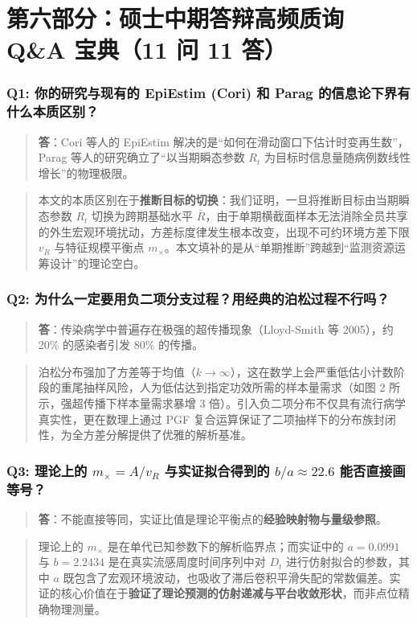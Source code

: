 \documentclass[11pt,a4paper]{ctexart}
\begin{document}
\section{第六部分：硕士中期答辩高频质询 Q\&A 宝典（11 问 11 答）}

\subsubsection{Q1: 你的研究与现有的 EpiEstim (Cori) 和 Parag 的信息论下界有什么本质区别？}
\begin{quote}\small\color{black!75}
\textbf{答}：Cori 等人的 EpiEstim 解决的是“如何在滑动窗口下估计时变再生数”，Parag 等人的研究确立了“以当期瞬态参数 $R_t$ 为目标时信息量随病例数线性增长”的物理极限。
\end{quote}
\begin{quote}\small\color{black!75}
本文的本质区别在于\textbf{推断目标的切换}：我们证明，一旦将推断目标由当期瞬态参数 $R_t$ 切换为跨期基础水平 $\bar{R}$，由于单期横截面样本无法消除全员共享的外生宏观环境扰动，方差标度律发生根本改变，出现不可约环境方差下限 $v_R$ 与特征规模平衡点 $m_\times$。本文填补的是从“单期推断”跨越到“监测资源运筹设计”的理论空白。
\end{quote}

\subsubsection{Q2: 为什么一定要用负二项分支过程？用经典的泊松过程不行吗？}
\begin{quote}\small\color{black!75}
\textbf{答}：传染病学中普遍存在极强的超传播现象（Lloyd-Smith 等 2005），约 20\% 的感染者引发 80\% 的传播。
\end{quote}
\begin{quote}\small\color{black!75}
泊松分布强加了方差等于均值（$k \to \infty$），这在数学上会严重低估小计数阶段的重尾抽样风险，人为低估达到指定功效所需的样本量需求（如图 2 所示，强超传播下样本量需求暴增 3 倍）。引入负二项分布不仅具有流行病学真实性，更在数理上通过 PGF 复合运算保证了二项抽样下的分布族封闭性，为全方差分解提供了优雅的解析基准。
\end{quote}

\subsubsection{Q3: 理论上的 $m_\times = A/v_R$ 与实证拟合得到的 $b/a \approx 22.6$ 能否直接画等号？}
\begin{quote}\small\color{black!75}
\textbf{答}：不能直接等同，实证比值是理论平衡点的\textbf{经验映射物与量级参照}。
\end{quote}
\begin{quote}\small\color{black!75}
理论上的 $m_\times$ 是在单代已知参数下的解析临界点；而实证中的 $a = 0.0991$ 与 $b = 2.2434$ 是在真实流感周度时间序列中对 $D_t$ 进行仿射拟合的参数，其中 $a$ 既包含了宏观环境波动，也吸收了滞后卷积平滑失配的常数偏差。实证的核心价值在于\textbf{验证了理论预测的仿射递减与平台收敛形状}，而非点位精确物理测量。
\end{quote}
\end{document}
